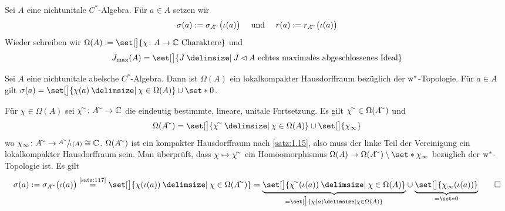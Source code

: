 \begin{definition}[{name=[Spektrum in nichtunitalen $C^*$-Algebren]}]
	Sei $A$ eine nichtunitale $C^*$-Algebra. Für $a \in A$ setzen wir 
	\[
		\sigma(a) := \sigma_{A^\simm} \enbrace[\big]{\iota(a)} \quad \text{ und } \quad r(a) := r_{A^\simm} \enbrace[\big]{\iota(a)} 
	\]
	Wieder schreiben wir $\Omega(A) := \set[\big]{\chi \colon A \to \mathbb{C} \text{ Charaktere}}$ und 
	\[
		J_{\max}(A)= \set[\big]{J \given J \lhd A \text{ echtes maximales abgeschlossenes Ideal}}
	\]
\end{definition}

\begin{satz}[label=satz:29,{name=[Spektrum einer nichtunitalen $C^*$-Algebra ist lokalkompakt]}]
	Sei $A$ eine nichtunitale abelsche $C^*$-Algebra. Dann ist $\Omega(A)$ ein lokalkompakter Hausdorffraum bezüglich der $\mathrm{w}^*$-Topologie. Für $a \in A$ gilt 
	$\sigma(a) = \set[\big]{\chi(a) \given \chi \in \Omega(A)} \cup \set*{0}$.
\end{satz}
\begin{beweis}
	Für $\chi \in \Omega(A)$ sei $\chi^\simm \colon A^\simm \to \mathbb{C}$ die eindeutig bestimmte, lineare, unitale Fortsetzung. Es gilt $\chi^\simm \in \Omega(A^\simm)$ und
	\[
		\Omega(A^\simm) = \set[\big]{\chi^\simm \given \chi \in \Omega(A)} \cup \set[\big]{\chi_\infty}
	\]
	wo $\chi_\infty \colon A^\simm \to \sfrac{A^\simm}{\iota(A)} \cong \mathbb{C}$. $\Omega(A^\simm)$ ist ein kompakter Hausdorffraum nach \autoref{satz:1.15}, also muss der linke 
	Teil der Vereinigung ein lokalkompakter Hausdorffraum sein.  Man überprüft, dass $\chi \mapsto \chi^\simm$ ein Homöomorphismus 
	$\Omega(A)\to \Omega(A^\simm) \setminus \set*{\chi_\infty}$ bezüglich der $\mathrm{w}^*$-Topologie ist. Es gilt
	\[
		\sigma(a) := \sigma_{A^\simm} \enbrace[\big]{\iota(a)} \StackText{\ref{satz:117}}{=} \set[\big]{\chi \enbrace*{\iota(a)} \given \chi \in \Omega(A^\simm)} = 
		\Underbrace{\set[\big]{\chi^\simm \enbrace*{\iota(a)}\given\chi \in \Omega(A)}}{= \set[\big]{\chi(a) \given \chi \in \Omega(A)}} \cup \Underbrace{\set[\big]{\chi_\infty 
		\enbrace*{\iota(a)}}}{=\set*{0}} \qedhere
	\]
\end{beweis}

